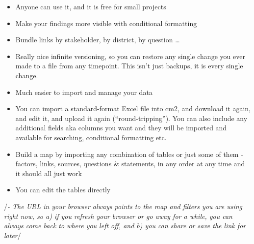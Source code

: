 \documentclass[
]{book}
\begin{document}
\begin{itemize}
\item
  Anyone can use it, and it is free for small projects
\item
  Make your findings more visible with conditional formatting
\item
  Bundle links by stakeholder, by district, by question \ldots{}
\item
  Really nice infinite versioning, so you can restore any single change you ever made to a file from any timepoint. This isn't just backups, it is every single change.
\item
  Much easier to import and manage your data
\item
  You can import a standard-format Excel file into cm2, and download it again, and edit it, and upload it again (``round-tripping''). You can also include any additional fields aka columns you want and they will be imported and available for searching, conditional formatting etc.
\item
  Build a map by importing any combination of tables or just some of them - factors, links, sources, questions \& statements, in any order at any time and it should all just work
\item
  You can edit the tables directly
\end{itemize}

/\emph{- The URL in your browser always points to the map and filters you are using right now, so a) if you refresh your browser or go away for a while, you can always come back to where you left off, and b) you can share or save the link for later}/
\end{document}
